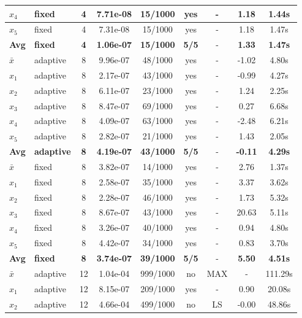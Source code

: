\begin{longtable}{|l|l|c|c|c|c|c|c|c|}
\hline
$x_4$ & fixed & 4 & 7.71e-08 & 15/1000 & yes & - & 1.18 & 1.44s \\
\hline
$x_5$ & fixed & 4 & 7.31e-08 & 15/1000 & yes & - & 1.18 & 1.47s \\
\hline
\hline\hline
\textbf{Avg} & \textbf{fixed} & \textbf{4} & \textbf{1.06e-07} & \textbf{15/1000} & \textbf{5/5} & - & \textbf{1.33} & \textbf{1.47s} \\
\hline\hline
$\bar{x}$ & adaptive & 8 & 9.96e-07 & 48/1000 & yes & - & -1.02 & 4.80s \\
\hline
$x_1$ & adaptive & 8 & 2.17e-07 & 43/1000 & yes & - & -0.99 & 4.27s \\
\hline
$x_2$ & adaptive & 8 & 6.11e-07 & 23/1000 & yes & - & 1.24 & 2.25s \\
\hline
$x_3$ & adaptive & 8 & 8.47e-07 & 69/1000 & yes & - & 0.27 & 6.68s \\
\hline
$x_4$ & adaptive & 8 & 4.09e-07 & 63/1000 & yes & - & -2.48 & 6.21s \\
\hline
$x_5$ & adaptive & 8 & 2.82e-07 & 21/1000 & yes & - & 1.43 & 2.05s \\
\hline
\hline\hline
\textbf{Avg} & \textbf{adaptive} & \textbf{8} & \textbf{4.19e-07} & \textbf{43/1000} & \textbf{5/5} & - & \textbf{-0.11} & \textbf{4.29s} \\
\hline\hline
\hline
$\bar{x}$ & fixed & 8 & 3.82e-07 & 14/1000 & yes & - & 2.76 & 1.37s \\
\hline
$x_1$ & fixed & 8 & 2.58e-07 & 35/1000 & yes & - & 3.37 & 3.62s \\
\hline
$x_2$ & fixed & 8 & 2.28e-07 & 46/1000 & yes & - & 1.73 & 5.32s \\
\hline
$x_3$ & fixed & 8 & 8.67e-07 & 43/1000 & yes & - & 20.63 & 5.11s \\
\hline
$x_4$ & fixed & 8 & 3.26e-07 & 40/1000 & yes & - & 0.94 & 4.80s \\
\hline
$x_5$ & fixed & 8 & 4.42e-07 & 34/1000 & yes & - & 0.83 & 3.70s \\
\hline
\hline\hline
\textbf{Avg} & \textbf{fixed} & \textbf{8} & \textbf{3.74e-07} & \textbf{39/1000} & \textbf{5/5} & - & \textbf{5.50} & \textbf{4.51s} \\
\hline\hline
$\bar{x}$ & adaptive & 12 & 1.04e-04 & 999/1000 & no & MAX & - & 111.29s \\
\hline
$x_1$ & adaptive & 12 & 8.15e-07 & 209/1000 & yes & - & 0.90 & 20.08s \\
\hline
$x_2$ & adaptive & 12 & 4.66e-04 & 499/1000 & no & LS & -0.00 & 48.86s \\

\end{longtable}
